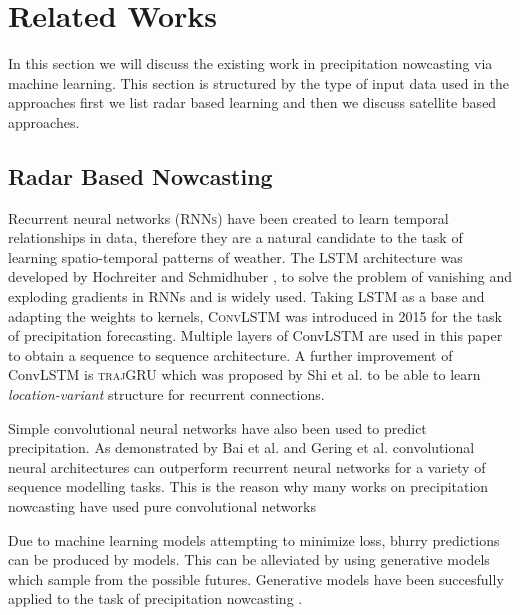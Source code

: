 \documentclass[acmtog, authorversion]{acmart}
\begin{document}
\section{Related Works}

In this section we will discuss the existing work in precipitation nowcasting via machine learning. This section is structured by the type of input data used in the approaches first we list radar based learning and then we discuss satellite based approaches.

\subsection{Radar Based Nowcasting}

Recurrent neural networks (\textsc{RNNs}) have been created to learn temporal relationships in data, therefore they are a natural candidate to the task of learning spatio-temporal patterns of weather. The \textsc{LSTM} architecture was developed by Hochreiter and Schmidhuber \cite{lstm}, to solve the problem of vanishing and exploding gradients in RNNs and is widely used. Taking LSTM as a base and adapting the weights to kernels, \textsc{ConvLSTM} \cite{convlstm} was introduced in 2015 for the task of precipitation forecasting. Multiple layers of ConvLSTM are used in this paper to obtain a sequence to sequence architecture. A further improvement of ConvLSTM is \textsc{trajGRU} which was proposed by Shi et al. \cite{shi2017deep} to be able to learn \textit{location-variant} structure for recurrent connections.
\medskip

Simple convolutional neural networks have also been used to predict precipitation. As demonstrated by Bai et al. and Gering et al. \cite{bai2018empirical, gehring2017convolutional} convolutional neural architectures can outperform recurrent neural networks for a variety of sequence modelling tasks. This is the reason why many works on precipitation nowcasting have used pure convolutional networks \cite{rainet,agrawal2019machine}
\medskip

Due to machine learning models attempting to minimize loss, blurry predictions can be produced by models. This can be alleviated by using generative models which sample from the possible futures. Generative models have been succesfully applied to the task of precipitation nowcasting \cite{}.

\end{document}
